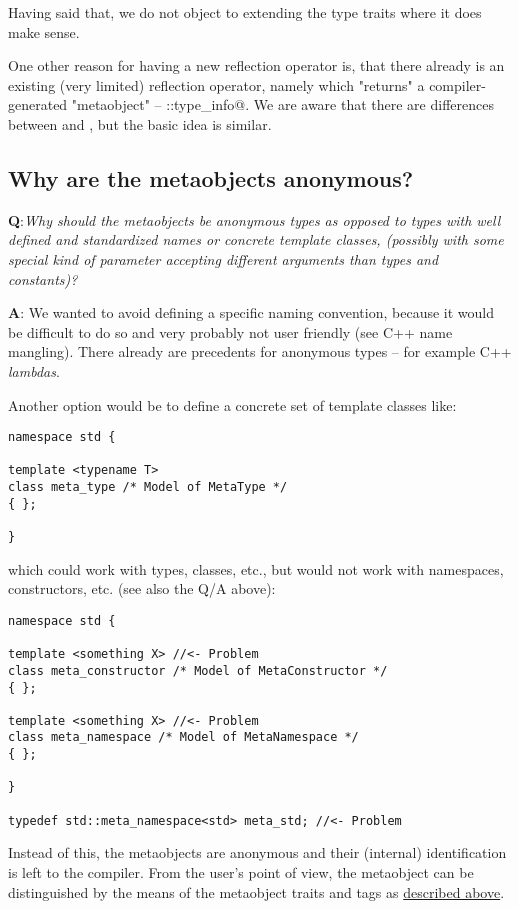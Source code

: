 Having said that, we do not object to extending the type traits where it does make sense.

One other reason for having a new reflection operator is, that there already is an
existing (very limited) reflection operator, namely \verb@typeid@ which "returns"
a compiler-generated "metaobject" -- \verb@std::type_info@. We are aware that there
are differences between \verb@typeid@ and \verb@mirrored@, but the basic idea is similar.

\subsection{Why are the metaobjects anonymous?}

{\textbf Q:}{\em Why should the metaobjects be anonymous types as opposed to
types with well defined and standardized names or concrete template classes, (possibly with some
special kind of parameter accepting different arguments than types and constants)?}

{\textbf A:} We wanted to avoid defining a specific naming convention, because it would
be difficult to do so and very probably not user friendly (see C++ name mangling). There
already are precedents for anonymous types -- for example C++ {\em lambdas}.

Another option would be to define a concrete set of template classes like:

\begin{verbatim}
namespace std {

template <typename T>
class meta_type /* Model of MetaType */
{ };

}
\end{verbatim}

which could work with types, classes, etc., but would not work with namespaces, constructors,
etc. (see also the Q/A above):

\begin{verbatim}
namespace std {

template <something X> //<- Problem
class meta_constructor /* Model of MetaConstructor */
{ };

template <something X> //<- Problem
class meta_namespace /* Model of MetaNamespace */
{ };

}

typedef std::meta_namespace<std> meta_std; //<- Problem
\end{verbatim}

Instead of this, the metaobjects are anonymous and their (internal) identification
is left to the compiler. From the user's point of view, the metaobject can be distinguished
by the means of the metaobject traits and tags as \hyperref[section-current-Concepts]{described above}.

